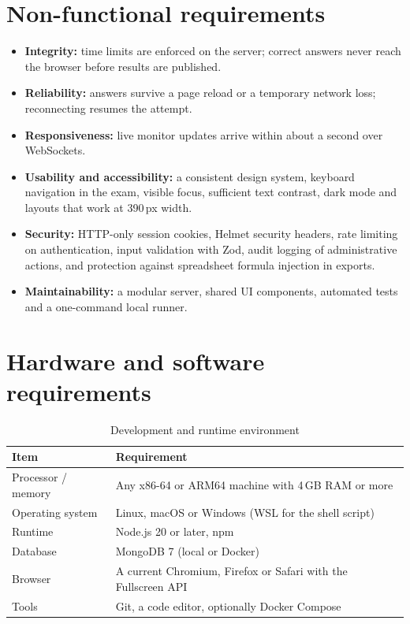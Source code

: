 \documentclass[12pt,a4paper,oneside]{report}
\newcommand{\code}[1]{\texttt{\detokenize{#1}}}
\begin{document}
\section{Non-functional requirements}
\begin{itemize}
  \item \textbf{Integrity:} time limits are enforced on the server; correct answers never reach the browser before results are published.
  \item \textbf{Reliability:} answers survive a page reload or a temporary network loss; reconnecting resumes the attempt.
  \item \textbf{Responsiveness:} live monitor updates arrive within about a second over WebSockets.
  \item \textbf{Usability and accessibility:} a consistent design system, keyboard navigation in the exam, visible focus, sufficient text contrast, dark mode and layouts that work at 390\,px width.
  \item \textbf{Security:} HTTP-only session cookies, Helmet security headers, rate limiting on authentication, input validation with Zod, audit logging of administrative actions, and protection against spreadsheet formula injection in exports.
  \item \textbf{Maintainability:} a modular server, shared UI components, automated tests and a one-command local runner.
\end{itemize}

\section{Hardware and software requirements}
\begin{table}[htbp]\centering
\caption{Development and runtime environment}\label{tab:env}
\begin{tabularx}{\linewidth}{@{}lX@{}}
\toprule
\textbf{Item} & \textbf{Requirement}\\ \midrule
Processor / memory & Any x86-64 or ARM64 machine with 4\,GB RAM or more\\
Operating system & Linux, macOS or Windows (WSL for the shell script)\\
Runtime & Node.js 20 or later, npm\\
Database & MongoDB 7 (local \code{mongod} or Docker)\\
Browser & A current Chromium, Firefox or Safari with the Fullscreen API\\
Tools & Git, a code editor, optionally Docker Compose\\
\bottomrule
\end{tabularx}
\end{table}
\end{document}
